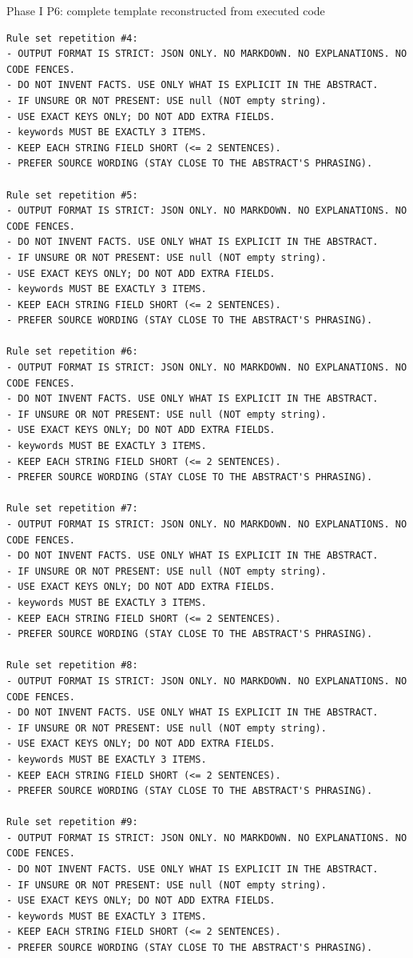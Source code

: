 \documentclass[fleqn,10pt]{wlscirep-authoryear}
\begin{document}
\begin{promptbox}{Phase I P6: complete template reconstructed from executed code}
\begin{lstlisting}[style=promptstyle]
Rule set repetition #4:
- OUTPUT FORMAT IS STRICT: JSON ONLY. NO MARKDOWN. NO EXPLANATIONS. NO CODE FENCES.
- DO NOT INVENT FACTS. USE ONLY WHAT IS EXPLICIT IN THE ABSTRACT.
- IF UNSURE OR NOT PRESENT: USE null (NOT empty string).
- USE EXACT KEYS ONLY; DO NOT ADD EXTRA FIELDS.
- keywords MUST BE EXACTLY 3 ITEMS.
- KEEP EACH STRING FIELD SHORT (<= 2 SENTENCES).
- PREFER SOURCE WORDING (STAY CLOSE TO THE ABSTRACT'S PHRASING).

Rule set repetition #5:
- OUTPUT FORMAT IS STRICT: JSON ONLY. NO MARKDOWN. NO EXPLANATIONS. NO CODE FENCES.
- DO NOT INVENT FACTS. USE ONLY WHAT IS EXPLICIT IN THE ABSTRACT.
- IF UNSURE OR NOT PRESENT: USE null (NOT empty string).
- USE EXACT KEYS ONLY; DO NOT ADD EXTRA FIELDS.
- keywords MUST BE EXACTLY 3 ITEMS.
- KEEP EACH STRING FIELD SHORT (<= 2 SENTENCES).
- PREFER SOURCE WORDING (STAY CLOSE TO THE ABSTRACT'S PHRASING).

Rule set repetition #6:
- OUTPUT FORMAT IS STRICT: JSON ONLY. NO MARKDOWN. NO EXPLANATIONS. NO CODE FENCES.
- DO NOT INVENT FACTS. USE ONLY WHAT IS EXPLICIT IN THE ABSTRACT.
- IF UNSURE OR NOT PRESENT: USE null (NOT empty string).
- USE EXACT KEYS ONLY; DO NOT ADD EXTRA FIELDS.
- keywords MUST BE EXACTLY 3 ITEMS.
- KEEP EACH STRING FIELD SHORT (<= 2 SENTENCES).
- PREFER SOURCE WORDING (STAY CLOSE TO THE ABSTRACT'S PHRASING).

Rule set repetition #7:
- OUTPUT FORMAT IS STRICT: JSON ONLY. NO MARKDOWN. NO EXPLANATIONS. NO CODE FENCES.
- DO NOT INVENT FACTS. USE ONLY WHAT IS EXPLICIT IN THE ABSTRACT.
- IF UNSURE OR NOT PRESENT: USE null (NOT empty string).
- USE EXACT KEYS ONLY; DO NOT ADD EXTRA FIELDS.
- keywords MUST BE EXACTLY 3 ITEMS.
- KEEP EACH STRING FIELD SHORT (<= 2 SENTENCES).
- PREFER SOURCE WORDING (STAY CLOSE TO THE ABSTRACT'S PHRASING).

Rule set repetition #8:
- OUTPUT FORMAT IS STRICT: JSON ONLY. NO MARKDOWN. NO EXPLANATIONS. NO CODE FENCES.
- DO NOT INVENT FACTS. USE ONLY WHAT IS EXPLICIT IN THE ABSTRACT.
- IF UNSURE OR NOT PRESENT: USE null (NOT empty string).
- USE EXACT KEYS ONLY; DO NOT ADD EXTRA FIELDS.
- keywords MUST BE EXACTLY 3 ITEMS.
- KEEP EACH STRING FIELD SHORT (<= 2 SENTENCES).
- PREFER SOURCE WORDING (STAY CLOSE TO THE ABSTRACT'S PHRASING).

Rule set repetition #9:
- OUTPUT FORMAT IS STRICT: JSON ONLY. NO MARKDOWN. NO EXPLANATIONS. NO CODE FENCES.
- DO NOT INVENT FACTS. USE ONLY WHAT IS EXPLICIT IN THE ABSTRACT.
- IF UNSURE OR NOT PRESENT: USE null (NOT empty string).
- USE EXACT KEYS ONLY; DO NOT ADD EXTRA FIELDS.
- keywords MUST BE EXACTLY 3 ITEMS.
- KEEP EACH STRING FIELD SHORT (<= 2 SENTENCES).
- PREFER SOURCE WORDING (STAY CLOSE TO THE ABSTRACT'S PHRASING).


\end{lstlisting}
\end{promptbox}
\end{document}
